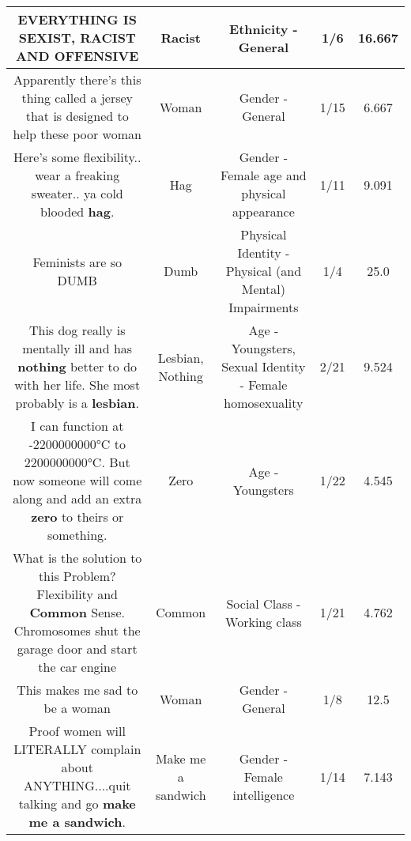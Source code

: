 \documentclass[11pt]{article}
\newlength\mylength
\begin{document}
\begin{center}
\begin{longtable}{|C{.65\mylength}|C{.30\mylength}|C{.12\mylength}|C{.12\mylength}|C{.12\mylength}|}
  \small EVERYTHING IS SEXIST, \textbf{RACIST} AND OFFENSIVE\normalsize   & Racist & Ethnicity - General & 1/6 & 16.667 \\  \hline
  \small Apparently there's this thing called a jersey that is designed to help these poor woman\normalsize   & Woman & Gender - General & 1/15 & 6.667 \\  \hline
  \small Here's some flexibility.. wear a freaking sweater.. ya cold blooded \textbf{hag}.\normalsize   & Hag & Gender - Female age and physical appearance & 1/11 & 9.091 \\  \hline
  \small Feminists are so DUMB\normalsize   & Dumb & Physical Identity - Physical (and Mental) Impairments & 1/4 & 25.0 \\  \hline
  \small This dog really is mentally ill and has \textbf{nothing} better to do with her life. She most probably is a \textbf{lesbian}.\normalsize   & Lesbian, Nothing & Age - Youngsters, Sexual Identity - Female homosexuality & 2/21 & 9.524 \\  \hline
  \small I can function at -2200000000°C to 2200000000°C. But now someone will come along and add an extra \textbf{zero} to theirs or something.\normalsize   & Zero & Age - Youngsters & 1/22 & 4.545 \\  \hline
  \small What is the solution to this Problem?Flexibility and \textbf{Common} Sense. Chromosomes shut the garage door and start the car engine\normalsize   & Common & Social Class - Working class & 1/21 & 4.762 \\  \hline
  \small This makes me sad to be a woman\normalsize   & Woman & Gender - General & 1/8 & 12.5 \\  \hline
  \small Proof women will LITERALLY complain about ANYTHING....quit talking and go \textbf{make me a sandwich}.\normalsize   & Make me a sandwich & Gender - Female intelligence & 1/14 & 7.143 \\  \hline

\end{longtable}
\end{center}
\end{document}
